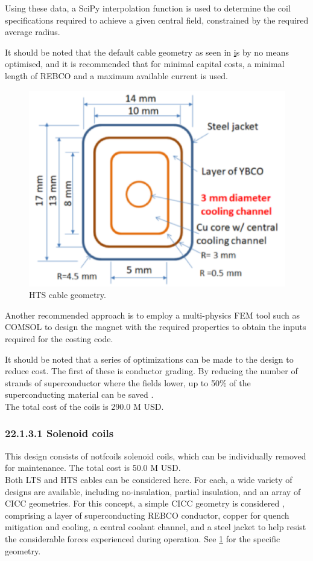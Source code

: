 Using these data, a SciPy interpolation function is used to determine the coil specifications required to achieve a given central field, constrained by the required average radius.

It should be noted that the default cable geometry as seen in \href{fig:yuhu_cs} is by no means optimised, and it is recommended that for minimal capital costs, a minimal length of REBCO and a maximum available current is used.


\begin{figure}[h]
    \centering
    \includegraphics[width =0.5\linewidth]{StandardFigures/yuhu_cs.pdf}
    \caption{HTS cable geometry.}
    \label{fig:yuhu_cs}
\end{figure}

Another recommended approach is to employ a multi-physics FEM tool such as COMSOL to design the magnet with the required properties to obtain the inputs required for the costing code.

It should be noted that a series of optimizations can be made to the design to reduce cost. The first of these is conductor grading. By reducing the number of strands of superconductor where the fields lower, up to 50\% of the superconducting material can be saved \cite{uglietti2018progressing}.\\

The total cost of the coils is 290.0 M USD.


\subsubsection*{22.1.3.1 Solenoid coils}

This design consists of notfcoils solenoid coils, which can be individually removed for maintenance. The total cost is 50.0 M USD.\\

Both LTS and HTS cables can be considered here. For each, a wide variety of designs are available, including no-insulation, partial insulation, and an array of CICC geometries. For this concept, a simple CICC geometry is considered \cite{Menard2016}, comprising a layer of superconducting REBCO conductor, copper for quench mitigation and cooling, a central coolant channel, and a steel jacket to help resist the considerable forces experienced during operation. See \ref{fig:yuhu_cs} for the specific geometry.\\

